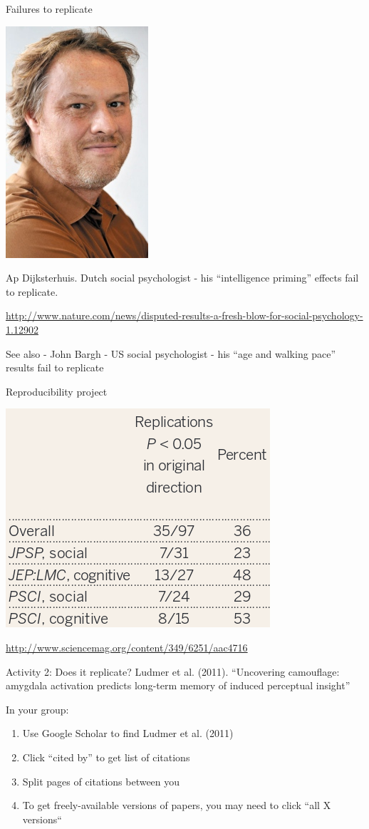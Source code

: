 \documentclass{beamer}
\begin{document}
\begin{frame}{Failures to replicate}
	\centerline{\includegraphics[width=.2\textwidth]{pics/ap.jpg}}

	Ap Dijksterhuis. Dutch social psychologist - his ``intelligence priming'' effects fail to replicate. 
	
	\url{http://www.nature.com/news/disputed-results-a-fresh-blow-for-social-psychology-1.12902}
	
	See also - John Bargh - US social psychologist - his ``age and walking pace'' results fail to replicate
	
\end{frame}

\begin{frame}{Reproducibility project}
	\centerline{\includegraphics[width=.8\textwidth]{pics/nosek.png}}
	\url{http://www.sciencemag.org/content/349/6251/aac4716}
\end{frame}

\begin{frame}{Activity 2: Does it replicate?}
  Ludmer et al. (2011). ``Uncovering camouflage: amygdala activation predicts
  long-term memory of induced perceptual insight''

  In your group: 
  \begin{enumerate}
    \item Use Google Scholar to find Ludmer et al. (2011)
    \item Click ``cited by'' to get list of citations
    \item Split pages of citations between you
    \item To get freely-available versions of papers, you may need to click ``all X versions``
    \end{enumerate}

\end{frame}
\end{document}
